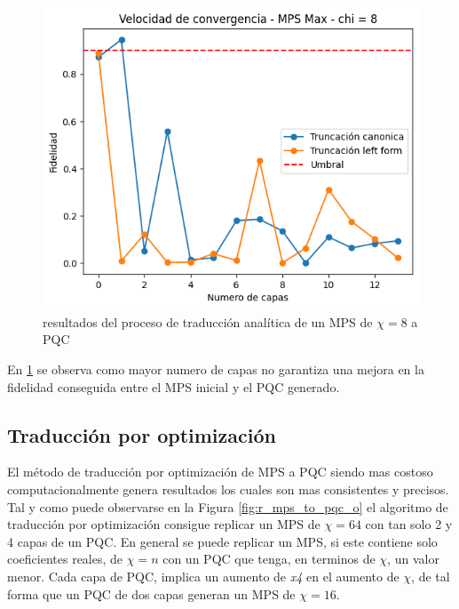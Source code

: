 \begin{figure}[!h]
    \centering
    \includegraphics[scale = 0.7]{plt/a03-mps_to_pqc_a_2.png}
    \caption{resultados del proceso de traducción analítica de un MPS de $\chi = 8$ a PQC}
    \label{fig:r_mps_to_pqc_a_2}
\end{figure}

En \ref{fig:r_mps_to_pqc_a_2} se observa como mayor numero de capas no garantiza una mejora en la fidelidad conseguida entre el MPS inicial y el PQC generado.

\subsection{Traducción por optimización}

El método de traducción por optimización de MPS a PQC siendo mas costoso computacionalmente genera resultados los cuales son mas consistentes y precisos. Tal y como puede observarse en la Figura \ref{fig:r_mps_to_pqc_o} el algoritmo de traducción por optimización consigue replicar un MPS de $\chi = 64$ con tan solo 2 y 4 capas de un PQC. En general se puede replicar un MPS, si este contiene solo coeficientes reales, de $\chi = n$ con un PQC que tenga, en terminos de $\chi$, un valor menor. Cada capa de PQC, implica un aumento de \textit{x4} en el aumento de $\chi$, de tal forma que un PQC de dos capas generan un MPS de $\chi = 16$.

\newpage

